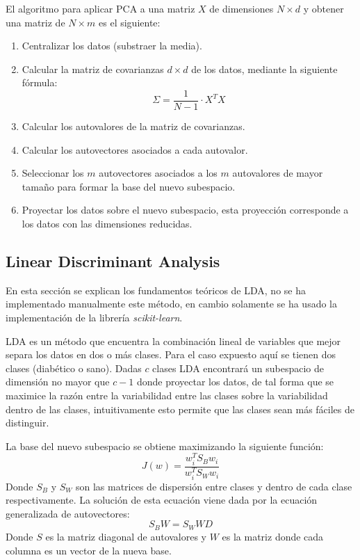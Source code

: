 \documentclass[letter, titlepage, 10pt]{article}
\begin{document}
El algoritmo para aplicar PCA a una matriz $X$ de dimensiones $N \times d$ y obtener una matriz de $N \times m$ es el siguiente:
\begin{enumerate}
\item Centralizar los datos (substraer la media).
\item Calcular la matriz de covarianzas $d \times d$ de los datos, mediante la siguiente fórmula:
    \begin{displaymath}
        \Sigma = \frac{1}{N - 1}\cdot X^T X
    \end{displaymath}
\item Calcular los autovalores de la matriz de covarianzas.
\item Calcular los autovectores asociados a cada autovalor.
\item Seleccionar los $m$ autovectores asociados a los $m$ autovalores de mayor tamaño para formar la base del nuevo subespacio.
\item Proyectar los datos sobre el nuevo subespacio, esta proyección corresponde a los datos con las dimensiones reducidas.
\end{enumerate}


\subsection{Linear Discriminant Analysis}
En esta sección se explican los fundamentos teóricos de LDA, no se ha implementado manualmente este método, en cambio solamente se ha usado la implementación de la librería \textit{scikit-learn}. 

LDA es un método que encuentra la combinación lineal de variables que mejor separa los datos en dos o más clases. Para el caso expuesto aquí se tienen dos clases (diabético o sano). Dadas $c$ clases LDA encontrará un subespacio de dimensión no mayor que $c-1$ donde proyectar los datos, de tal forma que se maximice la razón entre la variabilidad entre las clases sobre la variabilidad dentro de las clases, intuitivamente esto permite que las clases sean más fáciles de distinguir.

La base del nuevo subespacio se obtiene maximizando la siguiente función:
\begin{displaymath}
    J(w) = \frac{w_i^T S_B w_i}{w_i^T S_W w_i}
\end{displaymath}
Donde $S_B$ y $S_W$ son las matrices de dispersión entre clases y dentro de cada clase respectivamente. La solución de esta ecuación viene dada por la ecuación generalizada de autovectores:
\begin{displaymath}
    S_B W = S_W W D 
\end{displaymath}
Donde $S$ es la matriz diagonal de autovalores y $W$ es la matriz donde cada columna es un vector de la nueva base.
\end{document}
